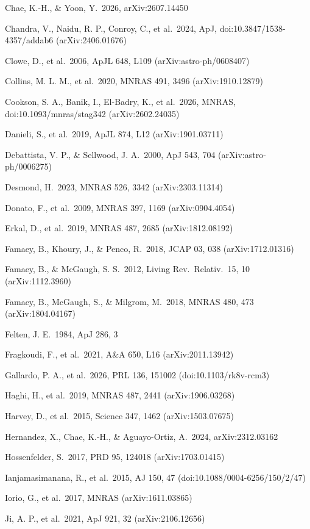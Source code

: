 \documentclass[
  10pt,
]{article}
\begin{document}
{\begin{list}{}{\setlength{\leftmargin}{1.5em}\setlength{\itemindent}{-1.5em}\setlength{\itemsep}{1pt}\setlength{\parsep}{0pt}}
\item Chae, K.-H., \& Yoon, Y.\ 2026, arXiv:2607.14450
\item Chandra, V., Naidu, R. P., Conroy, C., et al.\ 2024, ApJ, doi:10.3847/1538-4357/addab6 (arXiv:2406.01676)
\item Clowe, D., et al.\ 2006, ApJL 648, L109 (arXiv:astro-ph/0608407)
\item Collins, M. L. M., et al.\ 2020, MNRAS 491, 3496 (arXiv:1910.12879)
\item Cookson, S. A., Banik, I., El-Badry, K., et al.\ 2026, MNRAS, doi:10.1093/mnras/stag342 (arXiv:2602.24035)
\item Danieli, S., et al.\ 2019, ApJL 874, L12 (arXiv:1901.03711)
\item Debattista, V. P., \& Sellwood, J. A.\ 2000, ApJ 543, 704 (arXiv:astro-ph/0006275)
\item Desmond, H.\ 2023, MNRAS 526, 3342 (arXiv:2303.11314)
\item Donato, F., et al.\ 2009, MNRAS 397, 1169 (arXiv:0904.4054)
\item Erkal, D., et al.\ 2019, MNRAS 487, 2685 (arXiv:1812.08192)
\item Famaey, B., Khoury, J., \& Penco, R.\ 2018, JCAP 03, 038 (arXiv:1712.01316)
\item Famaey, B., \& McGaugh, S. S.\ 2012, Living Rev.\ Relativ.\ 15, 10 (arXiv:1112.3960)
\item Famaey, B., McGaugh, S., \& Milgrom, M.\ 2018, MNRAS 480, 473 (arXiv:1804.04167)
\item Felten, J. E.\ 1984, ApJ 286, 3
\item Fragkoudi, F., et al.\ 2021, A\&A 650, L16 (arXiv:2011.13942)
\item Gallardo, P. A., et al.\ 2026, PRL 136, 151002 (doi:10.1103/rk8v-rcm3)
\item Haghi, H., et al.\ 2019, MNRAS 487, 2441 (arXiv:1906.03268)
\item Harvey, D., et al.\ 2015, Science 347, 1462 (arXiv:1503.07675)
\item Hernandez, X., Chae, K.-H., \& Aguayo-Ortiz, A.\ 2024, arXiv:2312.03162
\item Hossenfelder, S.\ 2017, PRD 95, 124018 (arXiv:1703.01415)
\item Ianjamasimanana, R., et al.\ 2015, AJ 150, 47 (doi:10.1088/0004-6256/150/2/47)
\item Iorio, G., et al.\ 2017, MNRAS (arXiv:1611.03865)
\item Ji, A. P., et al.\ 2021, ApJ 921, 32 (arXiv:2106.12656)

\end{list}}
\end{document}
